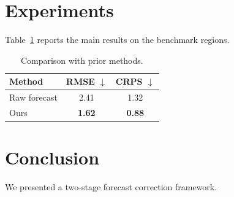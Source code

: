 \section{Experiments}
\label{sec:results}
Table~\ref{tab:results} reports the main results on the benchmark regions.

\begin{table}[t]
  \centering
  \caption{Comparison with prior methods.}
  \label{tab:results}
  \begin{tabular}{lcc}
    \toprule
    Method & RMSE $\downarrow$ & CRPS $\downarrow$ \\
    \midrule
    Raw forecast & 2.41 & 1.32 \\
    Ours & \textbf{1.62} & \textbf{0.88} \\
    \bottomrule
  \end{tabular}
\end{table}

\section{Conclusion}
We presented a two-stage forecast correction framework.

